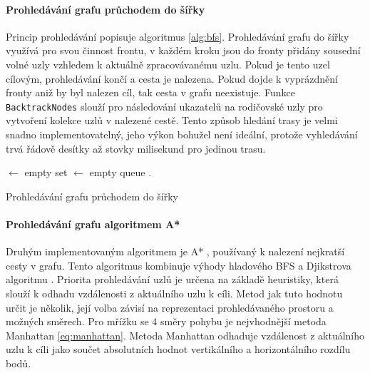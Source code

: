 \documentclass[czech,bachelor,public,dept460,male,oneside]{diploma}
\begin{document}
	\paragraph{Prohledávání grafu průchodem do šířky}
	Princip prohledávání popisuje algoritmus \ref{alg:bfs}. Prohledávání grafu do šířky využívá pro svou činnost frontu, v každém kroku jsou do fronty přidány sousední volné uzly vzhledem k aktuálně zpracovávanému uzlu. Pokud je tento uzel cílovým, prohledávání končí a cesta je nalezena. Pokud dojde k vyprázdnění fronty aniž by byl nalezen cíl, tak cesta v grafu neexistuje. Funkce \texttt{BacktrackNodes} slouží pro následování ukazatelů na rodičovské uzly pro vytvoření kolekce uzlů v nalezené cestě. Tento způsob hledání trasy je velmi snadno implementovatelný, jeho výkon bohužel není ideální, protože vyhledávání trvá řádově desítky až stovky milisekund pro jedinou trasu. \\
	
	\begin{algorithm}[H]
		
		
		
		\BlankLine
		
		\Closed $\leftarrow$ empty set\;
		\Open $\leftarrow$ empty queue\;
		\Open.\;
		\caption{Prohledávání grafu průchodem do šířky}
		\label{alg:bfs}
	\end{algorithm}
	
	\paragraph{Prohledávání grafu algoritmem A*}
	Druhým implementovaným algoritmem je A* \cite{aStar}, používaný k nalezení nejkratší cesty v grafu. Tento algoritmus kombinuje výhody hladového BFS a Djikstrova algoritmu \cite{aStar}. Priorita prohledávání uzlů je určena na základě heuristiky, která slouží k odhadu vzdálenosti z aktuálního uzlu k cíli. Metod jak tuto hodnotu určit je několik, její volba závisí na reprezentaci prohledávaného prostoru a možných směrech. Pro mřížku se 4 směry pohybu je nejvhodnější metoda Manhattan \ref{eq:manhattan}. Metoda Manhattan odhaduje vzdálenost z aktuálního uzlu k cíli jako součet absolutních hodnot vertikálního a horizontálního rozdílu bodů.
	
\end{document}
